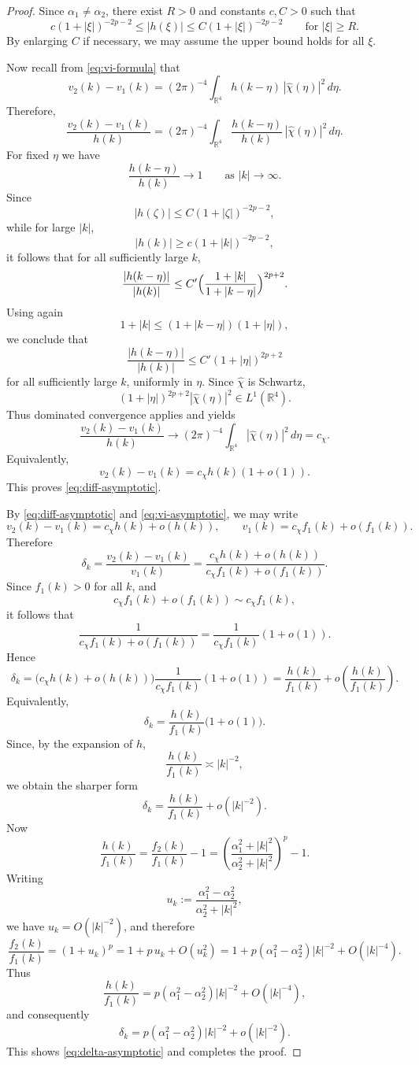 \documentclass[11pt, reqno]{amsart}
\theoremstyle{remark}
\newcommand{\R}{\mathbb{R}}
\newcommand{\1}{\mathbf{1}}
\begin{document}
\begin{proof}
Since $\alpha_1\ne\alpha_2$, there exist $R>0$ and constants $c,C>0$ such that
\[
c(1+|\xi|)^{-2p-2}\le |h(\xi)|\le C(1+|\xi|)^{-2p-2}
\qquad\text{for }|\xi|\ge R.
\]
By enlarging $C$ if necessary, we may assume the upper bound holds for all $\xi$.

Now recall from \eqref{eq:vi-formula} that
\[
v_2(k)-v_1(k)
=
(2\pi)^{-4}\int_{\R^4}h(k-\eta)\,|\widehat{\chi}(\eta)|^2\,d\eta.
\]
Therefore, %
\[
\frac{v_2(k)-v_1(k)}{h(k)}
=
(2\pi)^{-4}\int_{\R^4}\frac{h(k-\eta)}{h(k)}\,|\widehat{\chi}(\eta)|^2\,d\eta.
\]
For fixed \(\eta\) we have 
\[
\frac{h(k-\eta)}{h(k)}\to 1
\qquad\text{as }|k|\to\infty.
\]
Since
\[
|h(\zeta)|\le C(1+|\zeta|)^{-2p-2},
\]
while for large $|k|$,
\[
|h(k)|\ge c(1+|k|)^{-2p-2},
\]
it follows that for all sufficiently large $k$,
\[
\frac{|h(k-\eta)|}{|h(k)|}
\le
C'\Bigl(\frac{1+|k|}{1+|k-\eta|}\Bigr)^{2p+2}.
\]
Using again
\[
1+|k|\le (1+|k-\eta|)(1+|\eta|),
\]
we conclude that
\[
\frac{|h(k-\eta)|}{|h(k)|}
\le
C'(1+|\eta|)^{2p+2}
\]
for all sufficiently large \(k\), uniformly in \(\eta\).
Since \(\widehat{\chi}\) is Schwartz,
\[
(1+|\eta|)^{2p+2}|\widehat{\chi}(\eta)|^2\in L^1(\R^4).
\]
Thus dominated convergence applies and yields
\[
\frac{v_2(k)-v_1(k)}{h(k)}
\to
(2\pi)^{-4}\int_{\R^4}|\widehat{\chi}(\eta)|^2\,d\eta
=
c_\chi.
\]
Equivalently,
\[
v_2(k)-v_1(k)=c_\chi h(k)(1+o(1)).
\]
This proves \eqref{eq:diff-asymptotic}.

By \eqref{eq:diff-asymptotic} and \eqref{eq:vi-asymptotic}, we may write
\[
v_2(k)-v_1(k)=c_\chi h(k)+o(h(k)),
\qquad
v_1(k)=c_\chi f_1(k)+o(f_1(k)).
\]
Therefore
\[
\delta_k
=
\frac{v_2(k)-v_1(k)}{v_1(k)}
=
\frac{c_\chi h(k)+o(h(k))}{c_\chi f_1(k)+o(f_1(k))}.
\]
Since \(f_1(k)>0\) for all \(k\), and
\[
c_\chi f_1(k)+o(f_1(k))\sim c_\chi f_1(k),
\]
it follows that
\[
\frac{1}{c_\chi f_1(k)+o(f_1(k))}
=
\frac{1}{c_\chi f_1(k)}(1+o(1)).
\]
Hence
\[
\delta_k
=
\bigl(c_\chi h(k)+o(h(k))\bigr)\frac{1}{c_\chi f_1(k)}(1+o(1))
=
\frac{h(k)}{f_1(k)}+o\!\left(\frac{h(k)}{f_1(k)}\right).
\]
Equivalently,
\[
\delta_k
=
\frac{h(k)}{f_1(k)}\bigl(1+o(1)\bigr).
\]
Since, by the expansion of \(h\),
\[
\frac{h(k)}{f_1(k)}\asymp |k|^{-2},
\]
we obtain the sharper form
\[
\delta_k
=
\frac{h(k)}{f_1(k)}+o(|k|^{-2}).
\]
Now
\[
\frac{h(k)}{f_1(k)}
=
\frac{f_2(k)}{f_1(k)}-1
=
\left(\frac{\alpha_1^2+|k|^2}{\alpha_2^2+|k|^2}\right)^p-1.
\]
Writing
\[
u_k:=\frac{\alpha_1^2-\alpha_2^2}{\alpha_2^2+|k|^2},
\]
we have \(u_k=O(|k|^{-2})\), and therefore
\[
\frac{f_2(k)}{f_1(k)}
=
(1+u_k)^p
=
1+p\,u_k+O(u_k^2)
=
1+p(\alpha_1^2-\alpha_2^2)|k|^{-2}+O(|k|^{-4}).
\]
Thus
\[
\frac{h(k)}{f_1(k)}
=
p(\alpha_1^2-\alpha_2^2)|k|^{-2}+O(|k|^{-4}),
\]
and consequently
\[
\delta_k
=
p(\alpha_1^2-\alpha_2^2)|k|^{-2}+o(|k|^{-2}).
\]
This shows \eqref{eq:delta-asymptotic} and completes the proof.
\end{proof}
\end{document}
